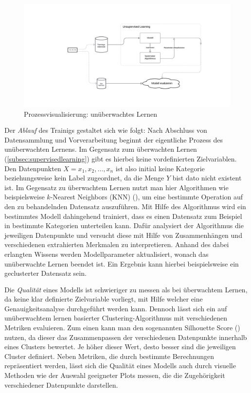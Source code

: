 \begin{figure}[H]\label{img:unsupervisedworkflow}
	\hspace{-15mm}
	\centering
	\includegraphics[width=\linewidth]{Bilder/UnsupervisedLearning.png}
	\caption{Prozessvisualisierung: unüberwachtes Lernen}
\end{figure}
Der \textit{Ablauf} des Trainigs gestaltet sich wie folgt: Nach Abschluss von Datensammlung und Vorverarbeitung beginnt der eigentliche Prozess des unüberwachten Lernens. Im Gegensatz zum überwachten Lernen (\ref{subsec:supervisedlearning}) gibt es hierbei keine vordefinierten Zielvariablen. Den Datenpunkten $X = x_1, x_2, \ldots, x_n$ ist also initial keine Kategorie beziehungsweise kein Label zugeordnet, da die Menge $Y$ bist dato nicht existent ist. Im Gegensatz zu überwachtem Lernen nutzt man hier Algorithmen wie beispielsweise \glqq $k$-Nearest Neighbors (KNN)\grqq{} (\cite[38]{joshi_machine_2020}), um eine bestimmte Operation auf den zu behandelnden Datensatz auszuführen. Mit Hilfe des Algorithmus wird ein bestimmtes Modell dahingehend trainiert, dass es einen Datensatz zum Beispiel in bestimmte Kategorien unterteilen kann. Dafür analysiert der Algorithmus die jeweiligen Datenpunkte und versucht diese mit Hilfe von Zusammenhängen und verschiedenen extrahierten Merkmalen zu interpretieren. Anhand des dabei erlangten Wissens werden Modellparameter aktualisiert, wonach das unüberwachte Lernen beendet ist. Ein Ergebnis kann hierbei beispielsweise ein \glqq geclusterter\grqq{} Datensatz sein.

Die  \textit{Qualität} eines Modells ist schwieriger zu messen als bei überwachtem Lernen, da keine klar definierte Zielvariable vorliegt, mit Hilfe welcher eine Genauigkeitsanalyse durchgeführt werden kann. Dennoch lässt sich ein auf unüberwachtem lernen basierter Clustering-Algorithmus mit verschiedenen Metriken evaluieren. Zum einen kann man den sogenannten Silhouette Score (\cite{shahapure_cluster_2020}) nutzen, da dieser das Zusammenpassen der verschiedenen Datenpunkte innerhalb eines Clusters bewertet. Je höher dieser Wert, desto besser sind die jeweiligen Cluster definiert. Neben Metriken, die durch bestimmte Berechnungen repräsentiert werden, lässt sich die Qualität eines Modells auch durch visuelle Methoden wie der Auswahl geeigneter Plots messen, die die Zugehörigkeit verschiedener Datenpunkte darstellen.

